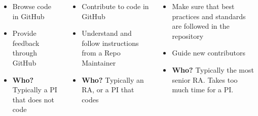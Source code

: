 

\begin{columns}[T] 
	\Large {}
	\begin{itemize}
		\small \item Browse code in GitHub
		\small \item Provide feedback through GitHub
		\small \item \textbf{Who?} Typically a PI that does not code
	\end{itemize}
	
	\Large {}
	\begin{itemize}
		\small \item Contribute to code in GitHub
		\small \item Understand and follow instructions from a Repo Maintainer
		\small \item \textbf{Who?} Typically an RA, or a PI that codes
	\end{itemize}
	
	\Large {}
	\begin{itemize}
		\small \item Make sure that best practices and standards are followed in the repository
		\small \item Guide new contributors
		\small \item \textbf{Who?} Typically the most senior RA. Takes too much time for a PI.
	\end{itemize}
	
\end{columns}
	



